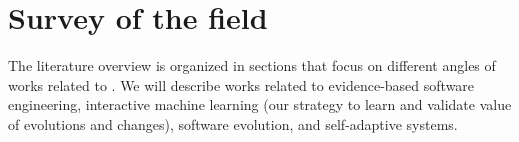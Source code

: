 \documentclass[12pt]{article}
\begin{document}
%




\vspace{-.5cm}

\section{Survey of the field}\label{sec:sota}
\vspace{-.4cm}

The literature overview is organized in sections that focus on different angles of works related to \name{}. We will describe works related to evidence-based software engineering, interactive machine learning (our strategy to learn and validate value of evolutions and changes), software evolution, and self-adaptive systems. %
\end{document}
